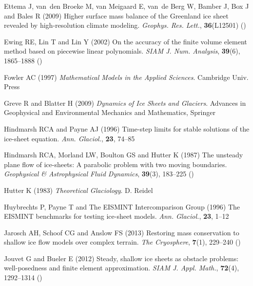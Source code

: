\documentclass[review,letterpaper]{igs}
\begin{document}
\begin{thebibliography}{42}
Ettema J, van~den Broeke M, van Meigaard E, van~de Berg W, Bamber J, Box J and
  Bales R (2009) Higher surface mass balance of the {G}reenland ice sheet
  revealed by high-resolution climate modeling. \emph{Geophys. Res. Lett.},
  \textbf{36}(L12501) ()

Ewing RE, Lin T and Lin Y (2002) On the accuracy of the finite volume element
  method based on piecewise linear polynomials. \emph{SIAM J. Num. Analysis},
  \textbf{39}(6), 1865--1888 ()

Fowler AC (1997) \emph{Mathematical Models in the Applied Sciences}. Cambridge
  Univ. Press

Greve R and Blatter H (2009) \emph{Dynamics of {I}ce {S}heets and {G}laciers}.
  Advances in Geophysical and Environmental Mechanics and Mathematics, Springer

Hindmarsh RCA and Payne AJ (1996) Time-step limits for stable solutions of the
  ice-sheet equation. \emph{Ann. Glaciol.}, \textbf{23}, 74--85

Hindmarsh RCA, Morland LW, Boulton GS and Hutter K (1987) The unsteady plane
  flow of ice-sheets: A parabolic problem with two moving boundaries.
  \emph{Geophysical \& Astrophysical Fluid Dynamics}, \textbf{39}(3), 183--225
  ()

Hutter K (1983) \emph{Theoretical {G}laciology}. D. Reidel

Huybrechts P, Payne T and {The EISMINT Intercomparison Group} (1996) The
  {EISMINT} benchmarks for testing ice-sheet models. \emph{Ann. Glaciol.},
  \textbf{23}, 1--12

Jarosch AH, Schoof CG and Anslow FS (2013) Restoring mass conservation to
  shallow ice flow models over complex terrain. \emph{The Cryosphere},
  \textbf{7}(1), 229--240 ()

Jouvet G and Bueler E (2012) Steady, shallow ice sheets as obstacle problems:
  well-posedness and finite element approximation. \emph{SIAM J. Appl. Math.},
  \textbf{72}(4), 1292--1314 ()


\end{thebibliography}
\end{document}
